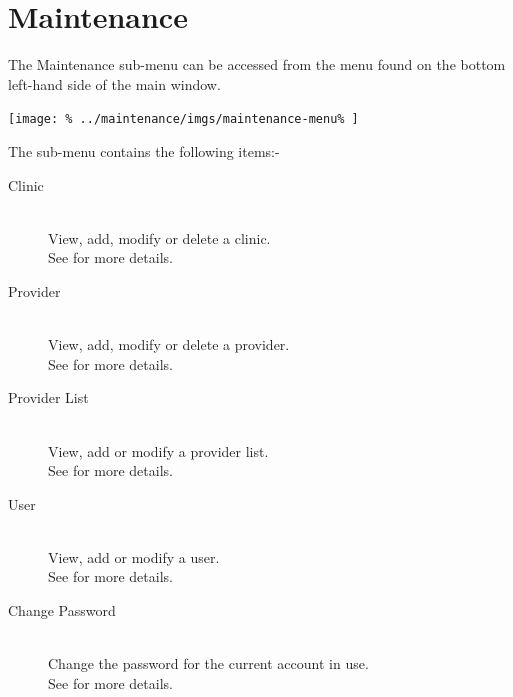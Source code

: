 \documentclass[../main/main]{subfiles}
\begin{document}
\newpage
\chapter{Maintenance}
The Maintenance sub-menu can be accessed from the menu found on the bottom
left-hand side of the main window.

\texttt{[image: \%
  ../maintenance/imgs/maintenance-menu\%
]}

The sub-menu contains the following items:-
\begin{description}
\item[Clinic] \hfill \\
View, add, modify or delete a clinic.\\
See  for more details.
\item[Provider] \hfill \\
View, add, modify or delete a provider.\\
See  for more details.
\item[Provider List] \hfill \\
View, add or modify a provider list.\\
See  for more details.
\item[User] \hfill \\
View, add or modify a user.\\
See  for more details.
\item[Change Password] \hfill \\
Change the password for the current account in use.\\
See  for more details.
\end{description}






\end{document}
